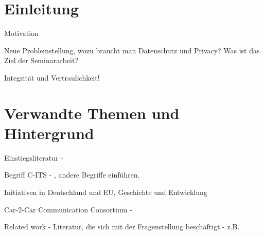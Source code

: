 
\section{Einleitung}
\label{ch:Introduction}


Motivation

Neue Problemstellung, wozu braucht man Datenschutz und Privacy? Was ist das Ziel der Seminararbeit?

Integrität und Vertraulichkeit!


\section{Verwandte Themen und Hintergrund}
\label{ch:Citation}

Einstiegsliteratur - 
\cite{Strubbe2017}
\cite{Kiometzis2017}

Begriff C-ITS - \cite{CITS2016}, andere Begriffe einführen.

Initiativen in Deutschland und EU, Geschichte und Entwicklung

Car-2-Car Communication Consortium - \cite{Car2Car}

Related work - Literatur, die sich mit der Fragenstellung beschäftigt - z.B. \cite{Jochum2020}


%

